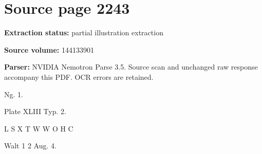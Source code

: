 \clearpage
\section{Source page 2243}
\textbf{Extraction status:} partial illustration extraction\par
\textbf{Source volume:} 144133901\par
\textbf{Parser:} NVIDIA Nemotron Parse 3.5. Source scan and unchanged raw response accompany this PDF. OCR errors are retained.\par\medskip
Ng. 1.\par\medskip
Plate XLIII
Typ. 2.\par\medskip
L
S
X
T
W
W
O
H
C\par\medskip
Walt
1
2
Aug. 4.\par\medskip
